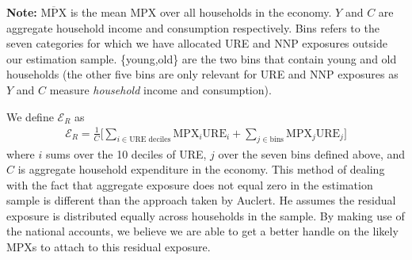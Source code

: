 \documentclass[titlepage]{\econtex}\newcommand{\texname}{ConsumptionHeterogeneity}
\begin{document}
	\begin{minipage}{1.0\textwidth}
		\begin{center}
			\label{table:auclertSS}
			\tiny \textbf{Note: } $\overline{\text{MPX}}$ is the mean MPX over all households in the economy. $Y$ and $C$ are aggregate household income and consumption respectively. Bins refers to the seven categories for which we have allocated URE and NNP exposures outside our estimation sample. \{young,old\} are the two bins that contain young and old households (the other five bins are only relevant for URE and NNP exposures as $Y$ and $C$ measure \textit{household} income and consumption).\\
		\end{center}
	\end{minipage}
	
	
	We define $\mathcal{E}_R$ as
	\begin{align}
	\mathcal{E}_R = \frac{1}{C}\Bigg[ \sum_{i \in \text{URE deciles} } \text{MPX}_i \text{URE}_i + \sum_{j \in \text{bins}} \text{MPX}_j \text{URE}_j \Bigg]
	\end{align}
	where $i$ sums over the 10 deciles of URE, $j$ over the seven bins defined above, and $C$ is aggregate household expenditure in the economy. This method of dealing with the fact that aggregate exposure does not equal zero in the estimation sample is different than the approach taken by Auclert. He assumes the residual exposure is distributed equally across households in the sample. By making use of the national accounts, we believe we are able to get a better handle on the likely MPXs to attach to this residual exposure.
	
\end{document}
